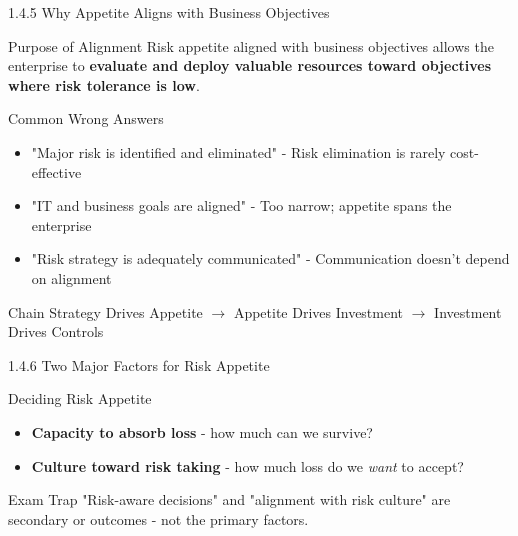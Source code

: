 \documentclass{beamer}
\begin{document}
	\begin{frame}{1.4.5 Why Appetite Aligns with Business Objectives}
		\begin{block}{Purpose of Alignment}
			Risk appetite aligned with business objectives allows the enterprise to \textbf{evaluate and deploy valuable resources toward objectives where risk tolerance is low}.
		\end{block}
		\begin{alertblock}{Common Wrong Answers}
			\begin{itemize}
				\item "Major risk is identified and eliminated" - Risk elimination is rarely cost-effective
				\item "IT and business goals are aligned" - Too narrow; appetite spans the enterprise
				\item "Risk strategy is adequately communicated" - Communication doesn't depend on alignment
			\end{itemize}
		\end{alertblock}
		\begin{exampleblock}{Chain}
			Strategy Drives Appetite $\rightarrow$ Appetite Drives Investment $\rightarrow$ Investment Drives Controls
		\end{exampleblock}
	\end{frame}
	
	\begin{frame}{1.4.6 Two Major Factors for Risk Appetite}
		\begin{block}{Deciding Risk Appetite}
			\begin{itemize}
				\item \textbf{Capacity to absorb loss} - how much can we survive?
				\item \textbf{Culture toward risk taking} - how much loss do we \textit{want} to accept?
			\end{itemize}
		\end{block}
		\begin{alertblock}{Exam Trap}
			"Risk-aware decisions" and "alignment with risk culture" are secondary or outcomes - not the primary factors.
		\end{alertblock}
	\end{frame}
	
\end{document}
